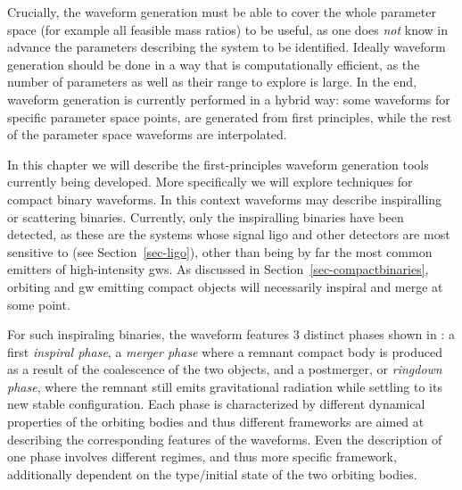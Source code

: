 \documentclass[
  11pt,
  a4paper,
  DIV=11,
  numbers=noendperiod,
  oneside]{scrreprt}
\DeclareRobustCommand{\[}{\begin{equation}}
\DeclareRobustCommand{\]}{\end{equation}}
\begin{document}
Crucially, the waveform generation must be able to cover the whole
parameter space (for example all feasible mass ratios) to be useful, as
one does \emph{not} know in advance the parameters describing the system
to be identified. Ideally waveform generation should be done in a way
that is computationally efficient, as the number of parameters as well
as their range to explore is large. In the end, waveform generation is
currently performed in a hybrid way: some waveforms for specific
parameter space points, are generated from first principles, while the
rest of the parameter space waveforms are interpolated.

In this chapter we will describe the first-principles waveform
generation tools currently being developed. More specifically we will
explore techniques for compact binary waveforms. In this context
waveforms may describe inspiralling or scattering binaries. Currently,
only the inspiralling binaries have been detected, as these are the
systems whose signal \gls{ligo} and other detectors are most sensitive
to (see Section~\ref{sec-ligo}), other than being by far the most common
emitters of high-intensity \glspl{gw}. As discussed in
Section~\ref{sec-compactbinaries}, orbiting and \gls{gw} emitting
compact objects will necessarily inspiral and merge at some point.

For such inspiraling binaries, the waveform features 3 distinct phases
shown in : a first \emph{inspiral phase}, a \emph{merger phase} where a
remnant compact body is produced as a result of the coalescence of the
two objects, and a postmerger, or \emph{ringdown phase}, where the
remnant still emits gravitational radiation while settling to its new
stable configuration. Each phase is characterized by different dynamical
properties of the orbiting bodies and thus different frameworks are
aimed at describing the corresponding features of the waveforms. Even
the description of one phase involves different regimes, and thus more
specific framework, additionally dependent on the type/initial state of
the two orbiting bodies.
\end{document}
